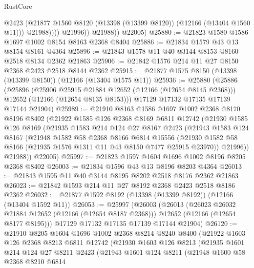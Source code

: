 \begin{lexlean}{RustCore}
\begin{coremodule}
                      @2423
                      (@21877 @1560 @8120 (@13398 (@13399 @8120)) (@12166 (@13404 @1560 @11)))
                      @21988))))
              @21996))
          @21988))
      @22005)
@25880 := @21823 @1580 @1586 @1697 @1002 @8154 @8163 @2368 @8404
@25886 := @21834 @1579 @43 @13 @8154 @8161 @4364
@25896 := @21843 @1578 @11 @40 @3144 @8153 @8160 @2518 @8134 @2362 @21863
@25906 := @21842 @1576 @214 @11 @27 @8150 @2368 @2423 @2518 @8144 @2362
@25915 := @21877 @1575 @8150 (@13398 (@13399 @8150)) (@12166 (@13404 @1575 @11))
@25936 := @25880
    (@25886
      (@25896
        (@25906 @25915 @21884 @12652 (@12166 (@12654 @8145 @2368)))
        @12652
        (@12166 (@12654 @8135 @8153)))
      @17129
      @17132
      @17135
      @17139
      @17144
      @21904)
@25989 := @21910
    @8163
    @1586
    @1697
    @1002
    @2368
    @8170
    @8196
    @8402
    (@21922
      @1585
      @126
      @2368
      @8169
      @6811
      @12742
      (@21930
        @1585
        @126
        @8169
        (@21935
          @1583
          @214
          @124
          @27
          @8167
          @2423
          (@21943
            @1583
            @124
            @8167
            (@21948
              @1582
              @58
              @2368
              @8166
              @6814
              @15556
              (@21930 @1582 @58 @8166 (@21935 @1576 @1311 @11 @43 @8150 @7477 @25915 @23970))
              @21996))
          @21988))
      @22005)
@25997 := @21823 @1597 @1604 @1696 @1002 @8196 @8205 @2368 @8402
@26003 := @21834 @1596 @43 @13 @8196 @8203 @4364
@26013 := @21843 @1595 @11 @40 @3144 @8195 @8202 @2518 @8176 @2362 @21863
@26023 := @21842 @1593 @214 @11 @27 @8192 @2368 @2423 @2518 @8186 @2362
@26032 := @21877 @1592 @8192 (@13398 (@13399 @8192)) (@12166 (@13404 @1592 @11))
@26053 := @25997
    (@26003
      (@26013
        (@26023 @26032 @21884 @12652 (@12166 (@12654 @8187 @2368)))
        @12652
        (@12166 (@12654 @8177 @8195)))
      @17129
      @17132
      @17135
      @17139
      @17144
      @21904)
@26120 := @21910
    @8205
    @1604
    @1696
    @1002
    @2368
    @8214
    @8240
    @8400
    (@21922
      @1603
      @126
      @2368
      @8213
      @6811
      @12742
      (@21930
        @1603
        @126
        @8213
        (@21935
          @1601
          @214
          @124
          @27
          @8211
          @2423
          (@21943
            @1601
            @124
            @8211
            (@21948
              @1600
              @58
              @2368
              @8210
              @6814

\end{coremodule}
\end{lexlean}
